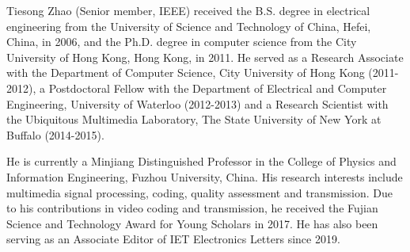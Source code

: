 \documentclass[journal]{IEEEtran}
\begin{document}
\vspace{-2 mm} 
\begin{IEEEbiography}{Tiesong Zhao} (Senior member, IEEE) received the B.S. degree in electrical engineering from the University of Science and Technology of China, Hefei, China, in 2006, and the Ph.D. degree in computer science from the City University of Hong Kong, Hong Kong, in 2011.
He served as a Research Associate with the Department of Computer Science, City University of Hong Kong (2011-2012), a Postdoctoral Fellow with the Department of Electrical and Computer Engineering, University of Waterloo (2012-2013) and a Research Scientist with the Ubiquitous Multimedia Laboratory, The State University of New York at Buffalo (2014-2015).

He is currently a Minjiang Distinguished Professor in the College of Physics and Information Engineering, Fuzhou University, China.
His research interests include multimedia signal processing, coding, quality assessment and transmission. Due to his contributions in video coding and transmission, he received the Fujian Science and Technology Award for Young Scholars in 2017. He has also been serving as an Associate Editor of IET Electronics Letters since 2019.
\end{IEEEbiography}
\vspace{-2 mm} 
\end{document}
